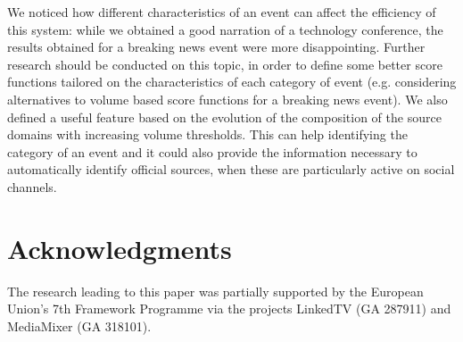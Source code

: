 \documentclass{sig-alternate-somus}
\begin{document}
We noticed how different characteristics of an event can affect the efficiency of this system: while we obtained a good narration of a technology conference, the results obtained for a breaking news event were more disappointing. Further research should be conducted on this topic, in order to define some better score functions tailored on the characteristics of each category of event (e.g. considering alternatives to volume based score functions for a breaking news event). We also defined a useful feature based on the evolution of the composition of the source domains with increasing volume thresholds. This can help identifying the category of an event and it could also provide the information necessary to automatically identify official sources, when these are particularly active on social channels.



\section*{Acknowledgments}
\label{sec:acknowledgments}
The research leading to this paper was partially supported by the European Union's 7th Framework Programme via the projects LinkedTV (GA 287911) and MediaMixer (GA 318101).

\nocite{*}


\balancecolumns
\end{document}
